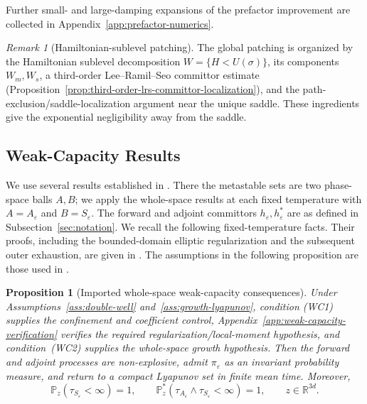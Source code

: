 \documentclass[11pt]{article}
\numberwithin{equation}{section}
\theoremstyle{plain}
\newtheorem{proposition}[theorem]{Proposition}
\theoremstyle{definition}
\theoremstyle{remark}
\newtheorem{remark}[theorem]{Remark}
\newcommand{\R}{\mathbb R}
\newcommand{\eps}{\varepsilon}
\newcommand{\Pbb}{\mathbb P}
\begin{document}
Further small- and large-damping expansions of the prefactor improvement are
collected in Appendix~\ref{app:prefactor-numerics}.

\begin{remark}[Hamiltonian-sublevel patching]
The global patching is organized by the
Hamiltonian sublevel decomposition $W=\{H<U(\sigma)\}$, its components
$W_m,W_s$, a third-order Lee--Ramil--Seo committor estimate
(Proposition~\ref{prop:third-order-lrs-committor-localization}), and the
path-exclusion/saddle-localization argument near the unique saddle.  These
ingredients give the exponential negligibility away from the saddle.
\end{remark}

\subsection{Weak-Capacity Results}
\label{sec:weak-capacity}

We use several results established in
\cite{HeLiWangZhu2026WeakEquilibrium}.  There the metastable sets are two
phase-space balls $A,B$; we apply the whole-space results at each fixed
temperature with $A=A_\eps$ and $B=S_\eps$.  The forward and adjoint
committors $h_\eps,h_\eps^*$ are as defined in
Subsection~\ref{sec:notation}.
We recall the following fixed-temperature facts.  Their proofs, including the
bounded-domain elliptic regularization and the subsequent outer exhaustion,
are given in \cite{HeLiWangZhu2026WeakEquilibrium}.
The assumptions in the following proposition are those used in
\cite[Propositions~2.45 and~2.49]{HeLiWangZhu2026WeakEquilibrium}.

\begin{proposition}[Imported whole-space weak-capacity consequences]
\label{prop:basic-recurrence-weak-capacity-interface}
Under Assumptions~\ref{ass:double-well} and~\ref{ass:growth-lyapunov},
condition \textup{(WC1)} supplies the
confinement and coefficient control,
Appendix~\ref{app:weak-capacity-verification} verifies the required
regularization/local-moment hypothesis, and condition~\textup{(WC2)} supplies
the whole-space growth hypothesis.  Then the
forward and adjoint processes are non-explosive, admit $\pi_\eps$ as an
invariant probability measure, and return to a compact Lyapunov set in finite
mean time.  Moreover,
\[
\Pbb_z(\tau_{S_\eps}<\infty)=1,
\qquad
\Pbb_z^*(\tau_{A_\eps}\wedge\tau_{S_\eps}<\infty)=1,
\qquad z\in\R^{3d}.
\]
\end{proposition}
\end{document}
